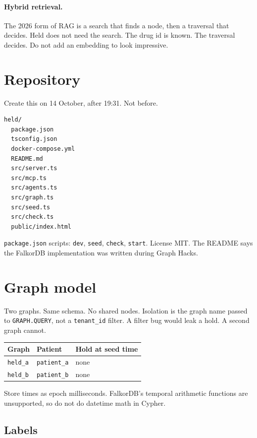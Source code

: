 \documentclass[11pt,a4paper]{article}
\newcommand{\code}[1]{\texttt{#1}}
\newcommand{\file}[1]{\texttt{#1}}
\begin{document}
\paragraph{Hybrid retrieval.}
The 2026 form of RAG is a search that finds a node, then a traversal that decides.
Held does not need the search. The drug id is known. The traversal decides.
Do not add an embedding to look impressive.

\section{Repository}

Create this on 14 October, after 19:31. Not before.

\begin{lstlisting}
held/
  package.json
  tsconfig.json
  docker-compose.yml
  README.md
  src/server.ts
  src/mcp.ts
  src/agents.ts
  src/graph.ts
  src/seed.ts
  src/check.ts
  public/index.html
\end{lstlisting}

\file{package.json} scripts: \code{dev}, \code{seed}, \code{check}, \code{start}.
License MIT. The README says the FalkorDB implementation was written during Graph Hacks.

\section{Graph model}
\label{sec:memory}

Two graphs. Same schema. No shared nodes. Isolation is the graph name passed to \code{GRAPH.QUERY}, not a \code{tenant\_id} filter. A filter bug would leak a hold. A second graph cannot.

\begin{center}
\begin{tabular}{@{}lll@{}}
\toprule
\textbf{Graph} & \textbf{Patient} & \textbf{Hold at seed time} \\
\midrule
\code{held\_a} & \code{patient\_a} & none \\
\code{held\_b} & \code{patient\_b} & none \\
\bottomrule
\end{tabular}
\end{center}

Store times as epoch milliseconds. FalkorDB's temporal arithmetic functions are unsupported, so do not do datetime math in Cypher.

\subsection{Labels}
\end{document}
